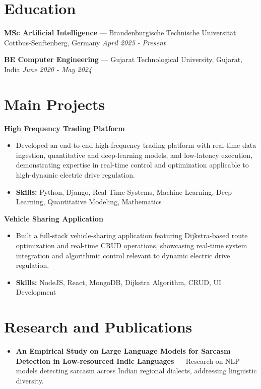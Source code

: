 \documentclass[a4paper,10pt]{article}
\begin{document}
\section*{Education}
\textbf{MSc Artificial Intelligence} — Brandenburgische Technische Universität Cottbus-Senftenberg, Germany \hfill \textit{April 2025 - Present}\par
\vspace{1.5pt}
\textbf{BE Computer Engineering} — Gujarat Technological University, Gujarat, India \hfill \textit{June 2020 - May 2024}\par

\section*{Main Projects}
\textbf{High Frequency Trading Platform}\par
\vspace{1pt}
\begin{itemize}
  \item Developed an end-to-end high-frequency trading platform with real-time data ingestion, quantitative and deep-learning models, and low-latency execution, demonstrating expertise in real-time control and optimization applicable to high-dynamic electric drive regulation.
  \item \textbf{Skills:} Python, Django, Real-Time Systems, Machine Learning, Deep Learning, Quantitative Modeling, Mathematics
\end{itemize}
\vspace{3pt}
\textbf{Vehicle Sharing Application}\par
\vspace{1pt}
\begin{itemize}
  \item Built a full-stack vehicle-sharing application featuring Dijkstra-based route optimization and real-time CRUD operations, showcasing real-time system integration and algorithmic control relevant to dynamic electric drive regulation.
  \item \textbf{Skills:} NodeJS, React, MongoDB, Dijkstra Algorithm, CRUD, UI Development
\end{itemize}

\section*{Research and Publications}
\begin{itemize}
\item \textbf{An Empirical Study on Large Language Models for Sarcasm Detection in Low-resourced Indic Languages} — Research on NLP models detecting sarcasm across Indian regional dialects, addressing linguistic diversity.
\end{itemize}
\end{document}
